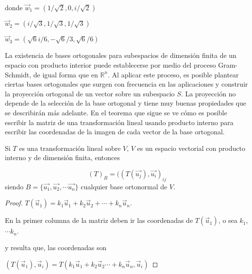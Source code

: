 {\begin{example}
\bigskip

donde $\vec{w}_1=(1/\sqrt{2},0,i/\sqrt{2})$

\bigskip

$\vec{w}_2=(i/\sqrt{3},1/\sqrt{3} , 1/\sqrt{3})$

\bigskip

$\vec{w}_3=(\sqrt{6}i/6,-\sqrt{6}/3 , \sqrt{6}/6)$
  
\end{example}

\bigskip

\bigskip
%
La existencia de bases ortogonales para subespacios de dimensión finita de un espacio
con producto interior puede establecerse por medio del proceso Gram-Schmidt, de igual
forma que en $\mathbb{R}^n$. Al aplicar este proceso, es posible plantear ciertas bases ortogonales
que surgen con frecuencia en las aplicaciones y  construir la proyección ortogonal de un vector sobre un subespacio $S$. La proyección no depende de la selección de la
base ortogonal y tiene muy buenas propiedades que se describirán más adelante.
En el teorema que sigue se ve cómo es posible escribir la matriz de una transformación lineal usando producto interno para escribir las coordenadas de la imagen de cada vector de la base ortogonal.

\bigskip

\begin{corollary}
    

Si $T$ es una transformación lineal sobre $V$, $V$ es un espacio vectorial con producto interno y de 
dimensión finita, entonces

$$ (T)_B=((T(\vec{u_j}),\vec{u_i})_{ij}$$
siendo $B=\{\vec{u_1}, \vec{u_2},\cdots  \vec{u_n}\}$ cualquier base ortonormal de $V$.

\begin{proof}
$T(\vec{u}_1)=k_1\vec{u}_1+k_2\vec{u}_2+ \cdots +k_n\vec{u}_n.$

\bigskip

En la primer columna de la matriz deben ir las coordenadas   de $T(\vec{u}_1)$, o sea  $k_1$,  $\cdots  k_n$.

\bigskip
\noindent
y resulta que, las coordenadas son

\bigskip

$(T(\vec{u}_1),\vec{u}_i )= T(k_1\vec{u}_1+k_2\vec{u}_2\cdots+k_n\vec{u}_n,\vec{u}_i)$

\bigskip


\end{proof}
\end{corollary}}
